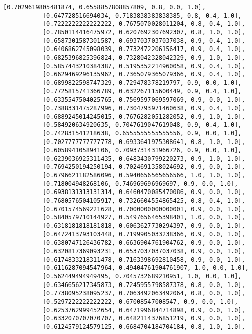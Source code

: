 \documentclass[11pt]{article}
\begin{document}
\begin{Verbatim}[commandchars=\\\{\}]
           [0.7029619805481874, 0.6558857808857809, 0.8, 0.0, 1.0],
           [0.647728516694034, 0.7183838383838385, 0.8, 0.4, 1.0],
           [0.7222222222222222, 0.7675070028011204, 0.8, 0.4, 1.0],
           [0.7850114416475972, 0.6207692307692307, 0.8, 1.0, 1.0],
           [0.6587301587301587, 0.6937037037037038, 0.9, 0.4, 1.0],
           [0.6406862745098039, 0.7732472206156417, 0.9, 0.4, 1.0],
           [0.6825396825396824, 0.7328042328042329, 0.9, 1.0, 1.0],
           [0.5857443210384387, 0.5195352214960058, 0.9, 0.4, 1.0],
           [0.6629469296135962, 0.7365079365079366, 0.9, 0.4, 1.0],
           [0.6899822598747329, 0.729478378219797, 0.9, 0.0, 1.0],
           [0.7725815741366789, 0.632267115600449, 0.9, 0.4, 1.0],
           [0.6335547504025765, 0.7569597069597069, 0.9, 0.0, 1.0],
           [0.7388331475287996, 0.7304793971460638, 0.9, 0.4, 1.0],
           [0.6889245014245015, 0.7676282051282052, 0.9, 1.0, 1.0],
           [0.584920634920635, 0.7047619047619048, 0.9, 0.4, 1.0],
           [0.742831541218638, 0.6555555555555556, 0.9, 0.0, 1.0],
           [0.7027777777777778, 0.6933641975308641, 0.8, 1.0, 1.0],
           [0.605894105894106, 0.7093731431966726, 0.9, 0.0, 1.0],
           [0.6239036925311435, 0.6483430799220273, 0.9, 1.0, 1.0],
           [0.7694250194250194, 0.7024691358024692, 0.9, 0.0, 1.0],
           [0.6796621182586096, 0.5940656565656566, 1.0, 1.0, 1.0],
           [0.718004948268106, 0.746969696969697, 0.9, 0.0, 1.0],
           [0.6938131313131314, 0.6460470085470086, 0.9, 0.0, 1.0],
           [0.7680576504105917, 0.7326604554865425, 0.8, 0.4, 1.0],
           [0.6701574569221628, 0.7000000000000001, 0.9, 0.0, 1.0],
           [0.5840579710144927, 0.5497656465398401, 1.0, 0.0, 1.0],
           [0.6318181818181818, 0.6063627730294397, 0.9, 0.0, 1.0],
           [0.6472413793103448, 0.7199905033238366, 0.9, 0.0, 1.0],
           [0.6380747126436782, 0.6636904761904762, 0.9, 0.0, 1.0],
           [0.6320817369093231, 0.6537037037037038, 0.9, 0.0, 1.0],
           [0.6174833218311478, 0.7163398692810458, 0.9, 0.0, 1.0],
           [0.6116287094547964, 0.49404761904761907, 1.0, 0.0, 1.0],
           [0.562449494949495, 0.7045732689210951, 1.0, 0.0, 1.0],
           [0.6346656217345873, 0.7245955798587378, 0.8, 0.0, 1.0],
           [0.7738095238095237, 0.7063492063492064, 0.8, 0.0, 1.0],
           [0.5297222222222222, 0.67008547008547, 0.9, 0.0, 1.0],
           [0.6253762999452654, 0.6471996844714898, 0.9, 0.0, 1.0],
           [0.6332070707070707, 0.6482114376851219, 0.9, 0.0, 1.0],
           [0.6124579124579125, 0.6684704184704184, 0.8, 1.0, 1.0],

\end{Verbatim}
\end{document}
